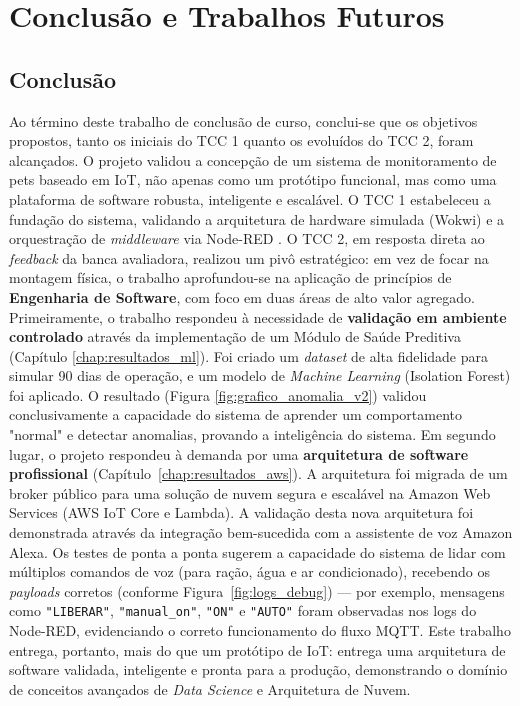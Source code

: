 \chapter{Conclusão e Trabalhos Futuros}
\label{chap:conclusao}

\section{Conclusão}
Ao término deste trabalho de conclusão de curso, conclui-se que os objetivos propostos, tanto os iniciais do TCC 1 quanto os evoluídos do TCC 2, foram alcançados.
O projeto validou a concepção de um sistema de monitoramento de pets baseado em IoT, não apenas como um protótipo funcional, mas como uma plataforma de software robusta, inteligente e escalável.
O TCC 1 estabeleceu a fundação do sistema, validando a arquitetura de hardware simulada (Wokwi) e a orquestração de \textit{middleware} via Node-RED .
O TCC 2, em resposta direta ao \textit{feedback} da banca avaliadora, realizou um pivô estratégico: em vez de focar na montagem física, o trabalho aprofundou-se na aplicação de princípios de \textbf{Engenharia de Software}, com foco em duas áreas de alto valor agregado.
Primeiramente, o trabalho respondeu à necessidade de \textbf{validação em ambiente controlado} através da implementação de um Módulo de Saúde Preditiva (Capítulo \ref{chap:resultados_ml}).
Foi criado um \textit{dataset} de alta fidelidade para simular 90 dias de operação, e um modelo de \textit{Machine Learning} (Isolation Forest) foi aplicado.
O resultado (Figura \ref{fig:grafico_anomalia_v2}) validou conclusivamente a capacidade do sistema de aprender um comportamento "normal" e detectar anomalias, provando a inteligência do sistema.
Em segundo lugar, o projeto respondeu à demanda por uma \textbf{arquitetura de software profissional} (Capítulo~\ref{chap:resultados_aws}).
A arquitetura foi migrada de um broker público para uma solução de nuvem segura e escalável na Amazon Web Services (AWS IoT Core e Lambda).
A validação desta nova arquitetura foi demonstrada através da integração bem-sucedida com a assistente de voz Amazon Alexa.
Os testes de ponta a ponta sugerem a capacidade do sistema de lidar com múltiplos comandos de voz (para ração, água e ar condicionado), recebendo os \textit{payloads} corretos (conforme Figura~\ref{fig:logs_debug}) — por exemplo, mensagens como \texttt{"LIBERAR"}, \texttt{"manual\_on"}, \texttt{"ON"} e \texttt{"AUTO"} foram observadas nos logs do Node-RED, evidenciando o correto funcionamento do fluxo MQTT.
Este trabalho entrega, portanto, mais do que um protótipo de IoT: entrega uma arquitetura de software validada, inteligente e pronta para a produção, demonstrando o domínio de conceitos avançados de \textit{Data Science} e Arquitetura de Nuvem.
